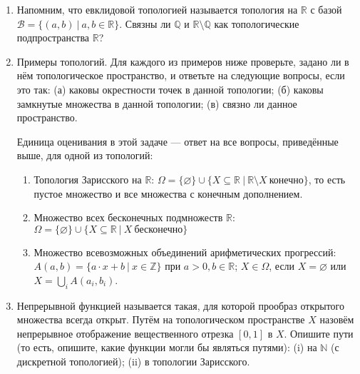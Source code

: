 \documentclass[10pt,a4paper,oneside]{article}
\begin{document}
\begin{enumerate}
\item Напомним, что евклидовой топологией называется топология на $\mathbb{R}$ с базой $\mathcal{B} = \{ (a,b)\ |\ a,b \in \mathbb{R} \}$.
Связны ли $\mathbb{Q}$ и $\mathbb{R}\setminus\mathbb{Q}$ как топологические подпространства $\mathbb{R}$?


\item Примеры топологий.
Для каждого из примеров ниже проверьте, задано ли в нём топологическое пространство, и ответьте на следующие вопросы, если это так:
(а) каковы окрестности точек в данной топологии;
(б) каковы замкнутые множества в данной топологии;
(в) связно ли данное пространство.

Единица оценивания в этой задаче --- ответ на все вопросы, приведённые выше, для одной из топологий:

\begin{enumerate}
\item Топология Зарисского на $\mathbb{R}$: 
$\Omega = \{\varnothing\} \cup \{ X \subseteq \mathbb{R}\ |\ \mathbb{R} \setminus X\ \text{конечно} \}$,
то есть пустое множество и все множества с конечным дополнением.
\item Множество всех бесконечных подмножеств $\mathbb{R}$:
$\Omega = \{\varnothing\} \cup \{ X \subseteq \mathbb{R}\ |\ X\ \text{бесконечно} \}$
\item Множество всевозможных объединений арифметических прогрессий:
$A(a,b) = \{ a\cdot x + b\ |\ x \in \mathbb{Z}\}$ при $a > 0, b \in \mathbb{R}$;
$X \in \Omega$, если $X=\varnothing$ или $X = \bigcup_i A(a_i,b_i)$. 
\end{enumerate}

\item Непрерывной функцией называется такая, для которой прообраз открытого множества всегда открыт.
Путём на топологическом пространстве $X$ назовём непрерывное отображение вещественного отрезка $[0,1]$ в $X$.
Опишите пути (то есть, опишите, какие функции могли бы являться путями): (i) на $\mathbb{N}$ (с дискретной топологией);
(ii) в топологии Зарисского.


\end{enumerate}
\end{document}
